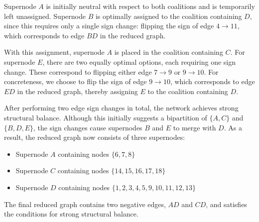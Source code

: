 \begin{question}
\begin{subquestion}
{			Supernode $A$ is initially neutral with respect to both coalitions and is temporarily left unassigned. Supernode $B$ is optimally assigned to the coalition containing $D$, since this requires only a single sign change: flipping the sign of edge $4 \to 11$, which corresponds to edge $BD$ in the reduced graph.
			
			With this assignment, supernode $A$ is placed in the coalition containing $C$. For supernode $E$, there are two equally optimal options, each requiring one sign change. These correspond to flipping either edge $7 \to 9$ or $9 \to 10$. For concreteness, we choose to flip the sign of edge $9 \to 10$, which corresponds to edge $ED$ in the reduced graph, thereby assigning $E$ to the coalition containing $D$.
			
			After performing two edge sign changes in total, the network achieves strong structural balance. Although this initially suggests a bipartition of $\{A, C\}$ and $\{B, D, E\}$, the sign changes cause supernodes $B$ and $E$ to merge with $D$. As a result, the reduced graph now consists of three supernodes:
			\begin{itemize}
				\item Supernode $A$ containing nodes $\{6,7,8\}$
				\item Supernode $C$ containing nodes $\{14,15,16,17,18\}$
				\item Supernode $D$ containing nodes $\{1,2,3,4,5,9,10,11,12,13\}$
			\end{itemize}
			
			The final reduced graph contains two negative edges, $AD$ and $CD$, and satisfies the conditions for strong structural balance.
		}
	\end{subquestion}
\end{question}

